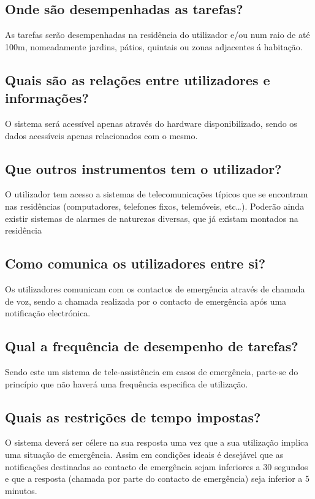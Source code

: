 \subsection{Onde são desempenhadas as tarefas?}
As tarefas serão desempenhadas na residência do utilizador e/ou num raio de até 100m, nomeadamente jardins, pátios, quintais ou zonas adjacentes á habitação.

\subsection{Quais são as relações entre utilizadores e informações?}
O sistema será acessível apenas através do hardware disponibilizado, sendo os dados acessíveis apenas relacionados com o mesmo.

\subsection{Que outros instrumentos tem o utilizador?}
O utilizador tem acesso a sistemas de telecomunicações típicos que se encontram nas residências (computadores, telefones fixos, telemóveis, etc…). Poderão ainda existir sistemas de alarmes de naturezas diversas, que já existam montados na residência

\subsection{Como comunica os utilizadores entre si?}
Os utilizadores comunicam com os contactos de emergência através de chamada de voz, sendo a chamada realizada por o contacto de emergência após uma notificação electrónica.

\subsection{Qual a frequência de desempenho de tarefas?}
Sendo este um sistema de tele-assistência em casos de emergência, parte-se do princípio que não haverá uma frequência especifica de utilização.

\subsection{Quais as restrições de tempo impostas?}
O sistema deverá ser célere na sua resposta uma vez que a sua utilização implica uma situação de emergência. Assim em condições ideais é desejável que as notificações destinadas ao contacto de emergência sejam inferiores a 30 segundos e que a resposta (chamada por parte do contacto de emergência) seja inferior a 5 minutos.

